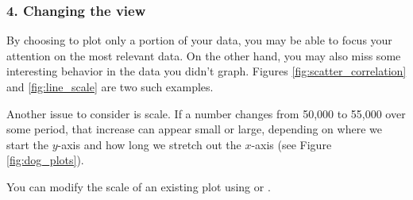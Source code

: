 \subsubsection*{4. Changing the view}

By choosing to plot only a portion of your data, you may be able to focus your attention on the most relevant data.  On the other hand, you may also miss some interesting behavior in the data you didn't graph. Figures \ref{fig:scatter_correlation} and \ref{fig:line_scale} are two such examples. 

Another issue to consider is scale. If a number changes from 50,000 to 55,000 over some period, that  increase can appear small or large, depending on where we start the $y$-axis and how long we stretch out the $x$-axis (see Figure \ref{fig:dog_plots}).

You can modify the scale of an existing plot using  or .

